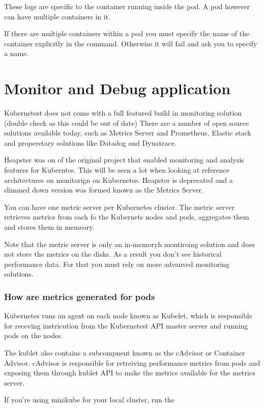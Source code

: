 \documentclass[11pt]{book}
\begin{document}
    These logs are specific to the container running inside the pod.
    A pod however can have multiple containers in it.

    If there are multiple containers within a pod you must specify the name of the container explicitly in the command.
    Otherwise it will fail and ask you to specify a name.

    \section{Monitor and Debug application}
    Kubernetest does not come with a full featured build in monitoring solution (double check as this could be out of date)
    There are a number of open source solutions available today, such as Metrics Server and Prometheus, Elastic stack and properetary solutions like Datadog and Dynatrace.

    Heapster was on of the original project that enabled monitoring and analysis features for Kuberntes.
    This will be seen a lot when looking at reference architectures on monitorign on Kubernetes.
    Heapster is deprecated and a slimmed down version was formed known as the Metrics Server.

    You can have one metric server per Kubernetes cluster.
    The metric server retrieves metrics from each fo the Kubernets nodes and pods, aggregates them and stores them in memeory.

    Note that the metric server is only an in-memoryh montiroing solution and does not store the metrics on the disks.
    As a result you don't see historical performance data.
    For that you must rely on more advanved monitoring solutions.

    \subsubsection{How are metrics generated for pods}
    Kubernetes runs an agent on each node known as Kubelet, which is responsible for receving instricution from the Kubernetest API master server and running pods on the nodes.

    The kublet also contains a subcompnent known as the cAdvisor or Container Advisor.
    cAdvisor is responsible for retreiving performance metrics from pods and exposing them through kublet API to make the metrics available for the metrics server.

    If you're using minikube for your local cluster, run the
\end{document}
